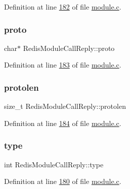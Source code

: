 Definition at line \hyperlink{module_8c_source_l00182}{182} of file \hyperlink{module_8c_source}{module.\+c}.

\mbox{\label{structRedisModuleCallReply_a09e50869906805e985d7d40ec53d572d}} 
\subsubsection{\texorpdfstring{proto}{proto}}
{\footnotesize\ttfamily char$\ast$ Redis\+Module\+Call\+Reply\+::proto}



Definition at line \hyperlink{module_8c_source_l00183}{183} of file \hyperlink{module_8c_source}{module.\+c}.

\mbox{\label{structRedisModuleCallReply_ab74570538b0a06cee21e661f6657325e}} 
\subsubsection{\texorpdfstring{protolen}{protolen}}
{\footnotesize\ttfamily size\+\_\+t Redis\+Module\+Call\+Reply\+::protolen}



Definition at line \hyperlink{module_8c_source_l00184}{184} of file \hyperlink{module_8c_source}{module.\+c}.

\mbox{\label{structRedisModuleCallReply_ad27f2d3249ada28cad8629d3cfea34aa}} 
\subsubsection{\texorpdfstring{type}{type}}
{\footnotesize\ttfamily int Redis\+Module\+Call\+Reply\+::type}



Definition at line \hyperlink{module_8c_source_l00180}{180} of file \hyperlink{module_8c_source}{module.\+c}.

